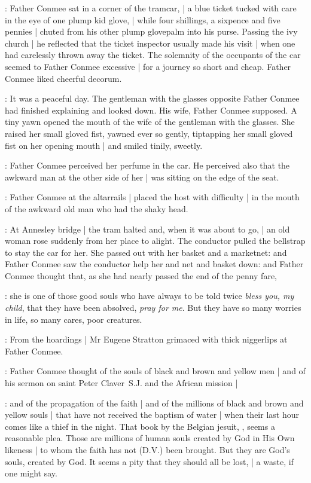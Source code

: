 :
Father Conmee sat in a corner of the tramcar, |
a blue ticket tucked with care in the eye of one plump kid glove, |
while four shillings, a sixpence and five pennies |
chuted from his other plump glovepalm into his purse.
Passing the ivy church |
he reflected that the ticket inspector usually made his visit |
when one had carelessly thrown away the ticket.
The solemnity of the occupants of the car
seemed to Father Conmee excessive |
for a journey so short and cheap.
Father Conmee liked cheerful decorum.

:
It was a peaceful day.
The gentleman with the glasses opposite Father Conmee
had finished explaining and looked down.
His wife, Father Conmee supposed.
A tiny yawn opened the mouth of the wife of the gentleman with the glasses.
She raised her small gloved fist,
yawned ever so gently,
tiptapping her small gloved fist on her opening mouth |
and smiled tinily, sweetly.

:
Father Conmee perceived her perfume in the car.
He perceived also that the awkward man at the other side of her |
was sitting on the edge of the seat.%

:
Father Conmee at the altarrails |
placed the host with difficulty |
in the mouth of the awkward old man who had the shaky head.

:
At Annesley bridge |
the tram halted and, when it was about to go, |
an old woman rose suddenly from her place to alight.
The conductor pulled the bellstrap to stay the car for her.
She passed out with her basket and a marketnet:
and Father Conmee saw the conductor help her and net and basket down:
and Father Conmee thought
that, as she had nearly passed the end of the penny fare,

\conmeeint:
she is one of those good souls who have always to be told twice
\emph{bless you, my child},
that they have been absolved,
\emph{pray for me}.
But they have so many worries in life,
so many cares, poor creatures.

:
From the hoardings |
Mr Eugene Stratton grimaced with thick niggerlips at Father Conmee.

:
Father Conmee thought of the souls of black and brown and yellow men |
and of his sermon on saint Peter Claver~S.J. and the African mission |

\conmeeint:
and of the propagation of the faith |
and of the millions of black and brown and yellow souls |
that have not received the baptism of water |
when their last hour comes like a thief in the night.
That book by the Belgian jesuit,
,
seems a reasonable plea.
Those are millions of human souls created by God in His Own likeness |
to whom the faith has not (D.V.) been brought.
But they are God's souls, created by God.
It seems a pity that they should all be lost, |
a waste, if one might say.

